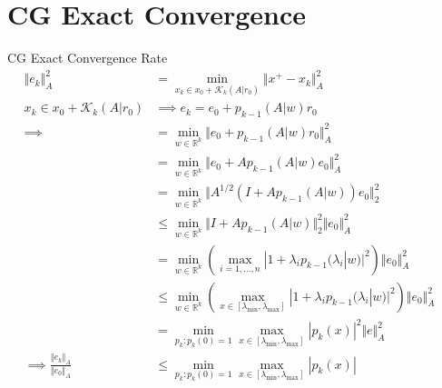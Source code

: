 \documentclass{beamer}
\begin{document}
\section{CG Exact Convergence}
    \begin{frame}{CG Exact Convergence Rate}
        {\footnotesize
        \begin{align}
            \Vert e_k\Vert_A^2 & =
            \min_{x_k \in x_0 + \mathcal K_k(A|r_0)}
            \Vert 
                x^+ - x_k
            \Vert_A^2
            \\
            x_k \in x_0 + \mathcal K_k(A|r_0) 
            & \implies
            e_k = e_0 + p_{k - 1}(A|w)r_0
            \\
            \implies  &=
            \min_{w\in \mathbb R^k}
            \Vert 
                e_0 + p_{k - 1}(A|w)r_0
            \Vert_A^2
            \\
            &= \min_{w\in \mathbb R^k}
            \Vert 
                e_0 + Ap_{k - 1}(A|w)e_0
            \Vert_A^2
            \\
            &= \min_{w\in \mathbb R^k}
            \Vert 
                A^{1/2}(I + Ap_{k - 1}(A|w))e_0
            \Vert_2^2
            \\
            &\le
            \min_{w\in \mathbb R^k}
            \Vert 
                I + Ap_{k - 1}(A|w)
            \Vert_2^2\Vert e_0\Vert_A^2 \quad 
            \\
            & = 
            \min_{w\in \mathbb R^k}
            \left(
                \max_{i = 1, \dots, n}
                |1 + \lambda_i p_{k - 1}(\lambda_i|w)|^2
            \right)\Vert e_0\Vert_A^2
            \quad
            \\
            & \le 
            \min_{w\in \mathbb R^k}
            \left(
                \max_{x\in [\lambda_{\min}, \lambda_{\max}]}
                |1 + \lambda_i p_{k - 1}(\lambda_i|w)|^2
            \right)\Vert e_0\Vert_A^2
            \quad 
            \\
            &= 
            \min_{p_{k}: p_{k}(0) = 1}
            \max_{x\in [\lambda_{\min}, \lambda_{\max}]}
            | p_{k}(x)|^2 \Vert e\Vert_A^2
            \\
            \implies
            \frac{\Vert e_k\Vert_A}{\Vert e_0\Vert_A} &\le 
            \min_{p_{k}: p_{k}(0) = 1}\max_{x\in [\lambda_{\text{min}}, \lambda_{\text{max}}]} |p_{k}(x)|   
        \end{align}
        }
    \end{frame}
\end{document}
